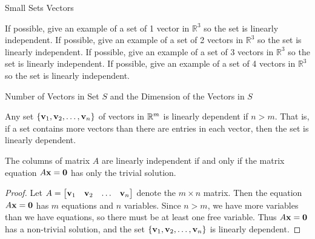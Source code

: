 \documentclass[xcolor=dvipsnames,aspectratio=169,t]{beamer}
\begin{document}
\begin{frame}{Small Sets Vectors}

  {\small
  \bb
  \ii If possible, give an example of a set of 1 vector in $\mathbb{R}^3$ so the set is linearly independent. \vspace{0.5in}
  \ii If possible, give an example of a set of 2 vectors in $\mathbb{R}^3$ so the set is linearly independent.  \vspace{0.5in}
  \ii If possible, give an example of a set of 3 vectors in $\mathbb{R}^3$ so the set is linearly independent. \vspace{0.5in}
  \ii If possible, give an example of a set of 4 vectors in $\mathbb{R}^3$ so the set is linearly independent.
  \ee
  }
  
\end{frame}


\begin{frame}{Number of Vectors in Set $S$ and  the Dimension of the Vectors in $S$}

  \begin{theorem}
    Any set $\left\{ \mathbf{v}_1, \mathbf{v}_2, \ldots, \mathbf{v}_n \right\}$ of vectors in $\mathbb{R}^m$ is \alert{linearly dependent} if \alert{$n > m$}.
    That is, if a set contains more vectors than there are entries in each vector, then the set is linearly dependent. 
  \end{theorem}

  \pause
  \bbox
  The columns of matrix $A$ are linearly independent if and only if the matrix equation $A\mathbf{x}=\mathbf{0}$ has \alert{only the trivial solution}.
  \ebox

  \begin{proof}
    Let $\displaystyle A = \begin{bmatrix} \mathbf{v}_1 & \mathbf{v}_2 & \ldots & \mathbf{v}_n \end{bmatrix}$ 
    denote the $m \times n$ matrix.
    Then the equation $A\mathbf{x}=\mathbf{0}$ has $m$ equations and $n$ variables.
    \pause
    Since $n >m$, we have more variables than we have equations, so there must be at least one free variable.
    Thus $A\mathbf{x} = \mathbf{0}$ has a non-trivial solution, and the set $\left\{ \mathbf{v}_1, \mathbf{v}_2, \ldots,  \mathbf{v}_n \right\}$ is linearly dependent.
    \end{proof}
  
  \end{frame}
\end{document}
